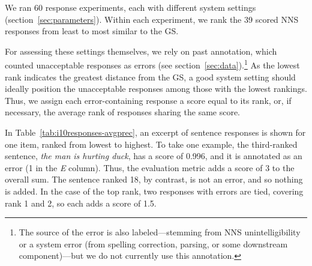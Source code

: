 \documentclass[11pt,letterpaper]{article}
\newcommand{\md}[1]{\marginpar{\scriptsize MD: #1}}
\newcommand{\lk}[1]{\marginpar{\scriptsize LK: #1}}
\renewcommand{\marginpar}[1]{}
\begin{document}
We ran 60 response experiments, each with different system settings
(section~\ref{sec:parameters}). Within each experiment, we rank the 39
scored NNS responses from least to most similar to the GS.
\md{Could/Should the footnote go into section 3?}
\lk{It could, but I kinda like it here}
For assessing these settings themselves, we rely on past annotation,
which counted unacceptable responses as errors (see
section~\ref{sec:data}).\footnote{The source of the error is also
  labeled---stemming from NNS unintelligibility or a system error
  (from spelling correction, parsing, or some downstream
  component)---but we do not currently use this annotation.}  As the
lowest rank indicates the greatest distance from the GS, a good system
setting should ideally position the unacceptable responses among those
with the lowest rankings. Thus, we assign each error-containing
response a score equal to its rank, or, if necessary, the average rank
of responses sharing the same score.

In Table~\ref{tab:i10responses-avgprec}, an excerpt of sentence
responses is shown for one item, ranked from lowest to highest.  To
take one example, the third-ranked sentence, \textit{the man is hurting duck}, has a score of 0.996, and it is annotated as an error (1 in
the \textit{E} column).  Thus, the evaluation metric adds a score of 3
to the overall sum.  The sentence ranked 18, by contrast, is not an
error, and so nothing is added.  In the case of the top rank, two
responses with errors are tied, covering rank 1 and 2, so each adds a score of 1.5.
\end{document}
